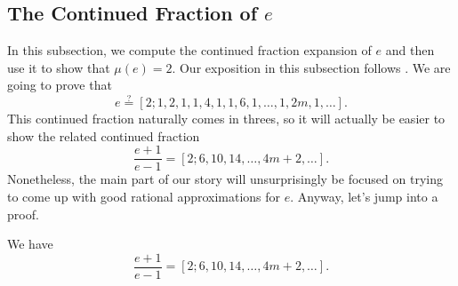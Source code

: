 \documentclass[../notes.tex]{subfiles}
\begin{document}
\subsection{The Continued Fraction of \texorpdfstring{$e$}{e}}
In this subsection, we compute the continued fraction expansion of $e$ and then use it to show that $\mu(e)=2$. Our exposition in this subsection follows \cite{olds-cf-e}. We are going to prove that
\[e\stackrel?=[2;1,2,1,1,4,1,1,6,1,\ldots,1,2m,1,\ldots].\]
This continued fraction naturally comes in threes, so it will actually be easier to show the related continued fraction
\[\frac{e+1}{e-1}=[2;6,10,14,\ldots,4m+2,\ldots].\]
Nonetheless, the main part of our story will unsurprisingly be focused on trying to come up with good rational approximations for $e$. Anyway, let's jump into a proof.
\begin{proposition} \label{prop:almost-e-cf}
	We have
	\[\frac{e+1}{e-1}=[2;6,10,14,\ldots,4m+2,\ldots].\]
\end{proposition}
\end{document}
